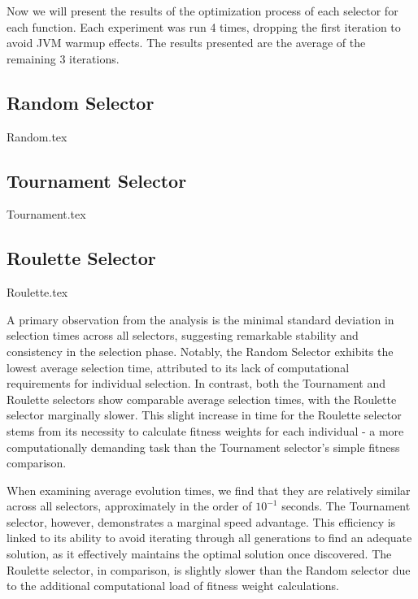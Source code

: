     Now we will present the results of the optimization process of each selector for each function.
    Each experiment was run 4 times, dropping the first iteration to avoid JVM warmup effects. The results presented are
    the average of the remaining 3 iterations.

    \newpage
    \begin{center}
        \subsection{Random Selector}
            {Random.tex}
        \subsection{Tournament Selector}
            {Tournament.tex}
        \subsection{Roulette Selector}
            {Roulette.tex}
    \end{center}

    A primary observation from the analysis is the minimal standard deviation in selection times across all selectors, 
    suggesting remarkable stability and consistency in the selection phase. Notably, the Random Selector exhibits the 
    lowest average selection time, attributed to its lack of computational requirements for individual selection. In 
    contrast, both the Tournament and Roulette selectors show comparable average selection times, with the Roulette 
    selector marginally slower. This slight increase in time for the Roulette selector stems from its necessity to 
    calculate fitness weights for each individual - a more computationally demanding task than the Tournament selector's 
    simple fitness comparison.

    When examining average evolution times, we find that they are relatively similar across all selectors, approximately 
    in the order of \(10^{-1}\) seconds. The Tournament selector, however, demonstrates a marginal speed advantage. This 
    efficiency is linked to its ability to avoid iterating through all generations to find an adequate solution, as it 
    effectively maintains the optimal solution once discovered. The Roulette selector, in comparison, is slightly slower 
    than the Random selector due to the additional computational load of fitness weight calculations.

